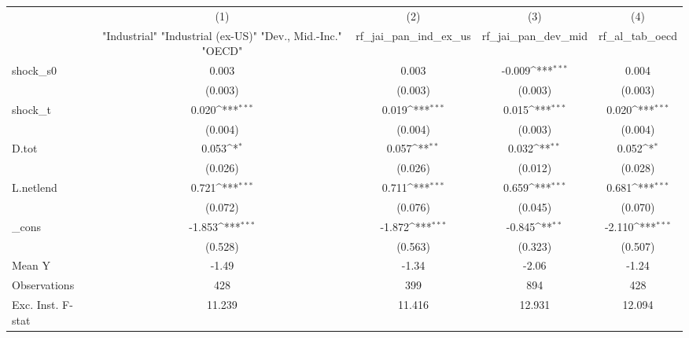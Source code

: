 {
\def\sym#1{\ifmmode^{#1}\else\(^{#1}\)\fi}
\begin{tabular}{l*{4}{c}}
\toprule
            &\multicolumn{1}{c}{(1)}&\multicolumn{1}{c}{(2)}&\multicolumn{1}{c}{(3)}&\multicolumn{1}{c}{(4)}\\
            &\multicolumn{1}{c}{ "Industrial" "Industrial (ex-US)" "Dev., Mid.-Inc." "OECD" }&\multicolumn{1}{c}{rf\_jai\_pan\_ind\_ex\_us}&\multicolumn{1}{c}{rf\_jai\_pan\_dev\_mid}&\multicolumn{1}{c}{rf\_al\_tab\_oecd}\\
\midrule
shock\_s0    &       0.003         &       0.003         &      -0.009\sym{***}&       0.004         \\
            &     (0.003)         &     (0.003)         &     (0.003)         &     (0.003)         \\
\addlinespace
shock\_t     &       0.020\sym{***}&       0.019\sym{***}&       0.015\sym{***}&       0.020\sym{***}\\
            &     (0.004)         &     (0.004)         &     (0.003)         &     (0.004)         \\
\addlinespace
D.tot       &       0.053\sym{*}  &       0.057\sym{**} &       0.032\sym{**} &       0.052\sym{*}  \\
            &     (0.026)         &     (0.026)         &     (0.012)         &     (0.028)         \\
\addlinespace
L.netlend   &       0.721\sym{***}&       0.711\sym{***}&       0.659\sym{***}&       0.681\sym{***}\\
            &     (0.072)         &     (0.076)         &     (0.045)         &     (0.070)         \\
\addlinespace
\_cons      &      -1.853\sym{***}&      -1.872\sym{***}&      -0.845\sym{**} &      -2.110\sym{***}\\
            &     (0.528)         &     (0.563)         &     (0.323)         &     (0.507)         \\
\midrule
Mean Y      &       -1.49         &       -1.34         &       -2.06         &       -1.24         \\
Observations&         428         &         399         &         894         &         428         \\
Exc. Inst. F-stat&      11.239         &      11.416         &      12.931         &      12.094         \\
\bottomrule
\end{tabular}
}
